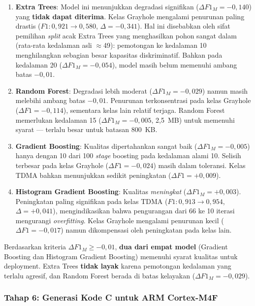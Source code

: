 \begin{enumerate}
    \item \textbf{Extra Trees}: Model ini menunjukkan degradasi signifikan ($\Delta F1_M = -0{,}140$) yang \textbf{tidak dapat diterima}. Kelas Grayhole mengalami penurunan paling drastis ($F1: 0{,}921 \to 0{,}580$, $\Delta = -0{,}341$). Hal ini disebabkan oleh sifat pemilihan \textit{split} acak Extra Trees yang menghasilkan pohon sangat dalam (rata-rata kedalaman asli $\approx$49): pemotongan ke kedalaman 10 menghilangkan sebagian besar kapasitas diskriminatif. Bahkan pada kedalaman 20 ($\Delta F1_M = -0{,}054$), model masih belum memenuhi ambang batas $-0{,}01$.

    \item \textbf{Random Forest}: Degradasi lebih moderat ($\Delta F1_M = -0{,}029$) namun masih melebihi ambang batas $-0{,}01$. Penurunan terkonsentrasi pada kelas Grayhole ($\Delta F1 = -0{,}114$), sementara kelas lain relatif terjaga. Random Forest memerlukan kedalaman 15 ($\Delta F1_M = -0{,}005$, 2,5~MB) untuk memenuhi syarat --- terlalu besar untuk batasan 800~KB.

    \item \textbf{Gradient Boosting}: Kualitas dipertahankan sangat baik ($\Delta F1_M = -0{,}005$) hanya dengan 10 dari 100 \textit{stage} boosting pada kedalaman alami 10. Selisih terbesar pada kelas Grayhole ($\Delta F1 = -0{,}024$) masih dalam toleransi. Kelas TDMA bahkan menunjukkan sedikit peningkatan ($\Delta F1 = +0{,}009$).

    \item \textbf{Histogram Gradient Boosting}: Kualitas \textit{meningkat} ($\Delta F1_M = +0{,}003$). Peningkatan paling signifikan pada kelas TDMA ($F1: 0{,}913 \to 0{,}954$, $\Delta = +0{,}041$), mengindikasikan bahwa pengurangan dari 66 ke 10 iterasi mengurangi \textit{overfitting}. Kelas Grayhole mengalami penurunan kecil ($\Delta F1 = -0{,}017$) namun dikompensasi oleh peningkatan pada kelas lain.
\end{enumerate}

Berdasarkan kriteria $\Delta F1_M \geq -0{,}01$, \textbf{dua dari empat model} (Gradient Boosting dan Histogram Gradient Boosting) memenuhi syarat kualitas untuk deployment. Extra Trees \textbf{tidak layak} karena pemotongan kedalaman yang terlalu agresif, dan Random Forest berada di batas kelayakan ($\Delta F1_M = -0{,}029$).

\subsubsection{Tahap 6: Generasi Kode C untuk ARM Cortex-M4F}

